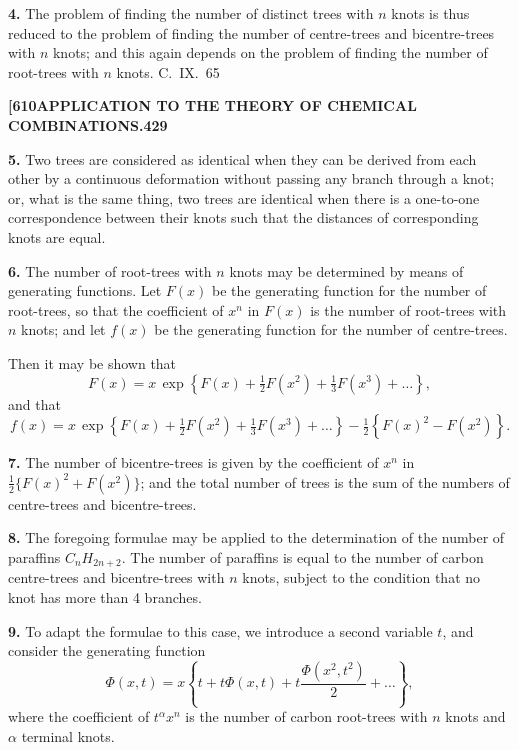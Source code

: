 \documentclass[11pt,a4paper]{article}
\begin{document}
{\medskip
\noindent\textbf{4.}
The problem of finding the number of distinct trees with $n$ knots is thus reduced to the problem of finding the number of centre-trees and bicentre-trees with $n$ knots; and this again depends on the problem of finding the number of root-trees with $n$ knots.
\hfill C.~IX.\ 65

\newpage
\noindent\textbf{[610}\hspace{\fill}\textbf{APPLICATION TO THE THEORY OF CHEMICAL COMBINATIONS.}\hspace{\fill}\textbf{429}

\noindent\textbf{5.}
Two trees are considered as identical when they can be derived from each other by a continuous deformation without passing any branch through a knot; or, what is the same thing, two trees are identical when there is a one-to-one correspondence between their knots such that the distances of corresponding knots are equal.

\medskip
\noindent\textbf{6.}
The number of root-trees with $n$ knots may be determined by means of generating functions. Let $F(x)$ be the generating function for the number of root-trees, so that the coefficient of $x^n$ in $F(x)$ is the number of root-trees with $n$ knots; and let $f(x)$ be the generating function for the number of centre-trees.

Then it may be shown that
\[
F(x) = x\, \exp\left\{F(x) + \tfrac{1}{2}F(x^2) + \tfrac{1}{3}F(x^3) + \ldots\right\},
\]
and that
\[
f(x) = x\, \exp\left\{F(x) + \tfrac{1}{2}F(x^2) + \tfrac{1}{3}F(x^3) + \ldots\right\} - \tfrac{1}{2}\left\{F(x)^2 - F(x^2)\right\}.
\]

\medskip
\noindent\textbf{7.}
The number of bicentre-trees is given by the coefficient of $x^n$ in $\frac{1}{2}\{F(x)^2 + F(x^2)\}$; and the total number of trees is the sum of the numbers of centre-trees and bicentre-trees.

\medskip
\noindent\textbf{8.}
The foregoing formulae may be applied to the determination of the number of paraffins $C_nH_{2n+2}$. The number of paraffins is equal to the number of carbon centre-trees and bicentre-trees with $n$ knots, subject to the condition that no knot has more than 4 branches.

\medskip
\noindent\textbf{9.}
To adapt the formulae to this case, we introduce a second variable $t$, and consider the generating function
\[
\Phi(x,t) = x\left\{t + t\Phi(x,t) + t\frac{\Phi(x^2,t^2)}{2} + \ldots\right\},
\]
where the coefficient of $t^\alpha x^n$ is the number of carbon root-trees with $n$ knots and $\alpha$ terminal knots.

}
\end{document}
